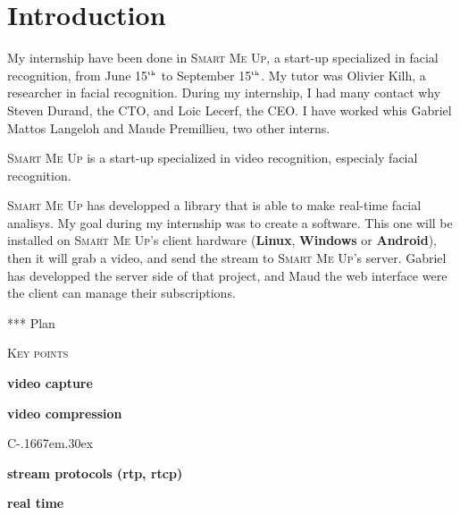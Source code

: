 \documentclass[a4paper,11pt]{custom}
\newcommand{\smu}{\textsc{Smart Me Up}}
\newcommand{\linux}{\textbf{Linux}}
\newcommand{\win}{\textbf{Windows}}
\newcommand{\android}{\textbf{Android}}
\newcommand{\nth}[1]{#1$^{\text{\tiny th}}$}
\newcommand{\cpp}{%
  C\kern-.1667em\raise.30ex\hbox{\smaller{++}}%
  \spacefactor1000%
}
\begin{document}


\chapter{Introduction}

My internship have been done in \smu, a start-up specialized in facial
recognition, from June \nth{15} to September \nth{15}. My tutor was Olivier
Kilh, a researcher in facial recognition. During my internship, I had many
contact why Steven Durand, the CTO, and Loic Lecerf, the CEO. I have worked whis
Gabriel Mattos Langeloh and Maude Premillieu, two other interns.

\smu{} is a start-up specialized in video recognition, especialy facial
recognition.

\smu{} has developped a library that is able to make real-time facial analisys.
My goal during my internship was to create a software. This one will be
installed on \smu's client hardware (\linux, \win{} or \android), then it will
grab a video, and send the stream to \smu's server. Gabriel has developped the
server side of that project, and Maud the web interface were the client can
manage their subscriptions.

*** Plan

\vspace{\fill}

\begin{center}
\textsc{\textsc{Key points}}
\end{center}

\begin{itemize}
\begin{multicols}{2}
\item \textbf{video capture}
\item \textbf{video compression}
\item \cpp
\item \textbf{stream protocols (rtp, rtcp)}
\item \textbf{real time}
\\
\end{multicols}
\end{itemize}
\end{document}

